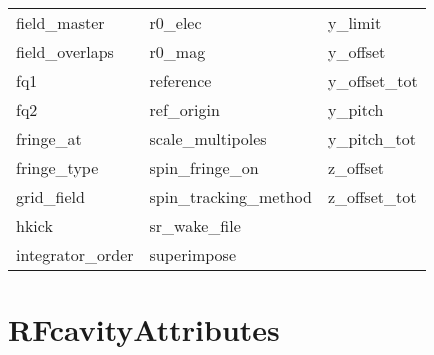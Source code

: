 \begin{tabular}{lll}
field_master                & r0_elec                     & y_limit                     \\
field_overlaps              & r0_mag                      & y_offset                    \\
fq1                         & reference                   & y_offset_tot                \\
fq2                         & ref_origin                  & y_pitch                     \\
fringe_at                   & scale_multipoles            & y_pitch_tot                 \\
fringe_type                 & spin_fringe_on              & z_offset                    \\
grid_field                  & spin_tracking_method        & z_offset_tot                \\
hkick                       & sr_wake_file                &                             \\
integrator_order            & superimpose                 &                             \\
 \bottomrule
 \end{tabular}
 \vfill
 
 \section{RFcavityAttributes}
 \label{s:list.rfcavity}
 
